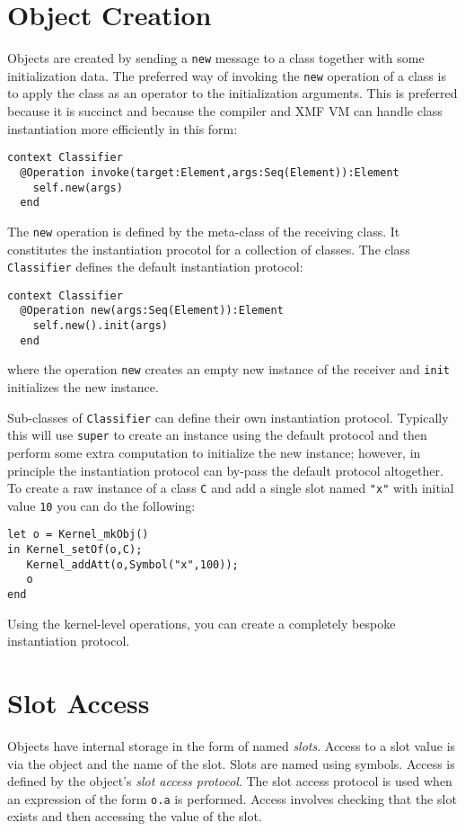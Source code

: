 \documentclass{article}
\begin{document}
\section{Object Creation}

Objects are created by sending a {\tt new} message to a class together with some initialization
data. The preferred way of invoking the {\tt new} operation of a class is to apply the class
as an operator to the initialization arguments. This is preferred because it is succinct and
because the compiler and XMF VM can handle class instantiation more efficiently in this
form:
\begin{verbatim}
context Classifier
  @Operation invoke(target:Element,args:Seq(Element)):Element
    self.new(args)
  end
\end{verbatim}
The {\tt new} operation is defined by the meta-class of the receiving class. It constitutes
the instantiation procotol for a collection of classes. The class {\tt Classifier} defines
the default instantiation protocol:
\begin{verbatim}
context Classifier
  @Operation new(args:Seq(Element)):Element
    self.new().init(args)
  end
\end{verbatim}
where the operation {\tt new} creates an empty new instance of the receiver and {\tt init}
initializes the new instance. 

Sub-classes of {\tt Classifier} can define their own instantiation protocol. Typically
this will use {\tt super} to create an instance using the default protocol and then perform
some extra computation to initialize the new instance; however, in principle the instantiation
protocol can by-pass the default protocol altogether. To create a raw instance of a class
{\tt C} and add a single slot named {\tt "x"} with initial value {\tt 10} you can do the following:
\begin{verbatim}
let o = Kernel_mkObj()
in Kernel_setOf(o,C);
   Kernel_addAtt(o,Symbol("x",100));
   o
end
\end{verbatim}
Using the kernel-level operations, you can create a completely bespoke instantiation protocol.

\section{Slot Access}

Objects have internal storage in the form of named {\em slots}. Access to a slot value is via the
object and the name of the slot. Slots are named using symbols. Access is defined by the object's 
{\em slot access protocol}. The slot access protocol is used when an expression of the form {\tt o.a}
is performed. Access involves checking that the slot exists and then accessing the value of
the slot.
\end{document}
